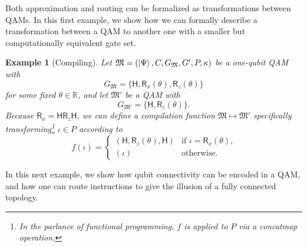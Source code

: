 \documentclass[conference]{IEEEtran}
\newcommand{\RX}{\ensuremath{\mathsf{R}_x}}
\newcommand{\RZ}{\ensuremath{\mathsf{R}_z}}
\newcommand{\HADAMARD}{\ensuremath{\mathsf{H}}}
\newtheorem{example}{Example}
\begin{document}
Both approximation and routing can be formalized as transformations between QAMs. In this first example, we show how we can formally describe a transformation between a QAM to another one with a smaller but computationally equivalent gate set.
\begin{example}[Compiling]\label{ex:compile}
Let $\mathfrak{M}=(\ket{\Psi}, C, G_{\mathfrak{M}}, G', P, \kappa)$ be a one-qubit QAM with \[G_{\mathfrak{M}}=\{\HADAMARD, \RX(\theta), \RZ(\theta)\}\] for some fixed $\theta\in\mathbb{R}$, and let $\mathfrak{M}'$ be a QAM with \[G_{\mathfrak{M}'}=\{\HADAMARD, \RZ(\theta)\}.\] Because $\RX = \HADAMARD\RZ\HADAMARD$, we can define a compilation function $\mathfrak{M}\mapsto\mathfrak{M}'$ specifically transforming\footnote{In the parlance of functional programming, $f$ is applied to $P$ via a \emph{concatmap} operation.} $\iota\in P$ according to
\begin{equation*}
    f(\iota) =
    \begin{cases}
    (\HADAMARD, \RZ(\theta), \HADAMARD) &\text{if $\iota=\RX(\theta)$,}\\
    (\iota)                             &\text{otherwise.}
    \end{cases}
\end{equation*}
\end{example}

In this next example, we show how qubit connectivity can be encoded in a QAM, and how one can route instructions to give the illusion of a fully connected topology.
\end{document}
